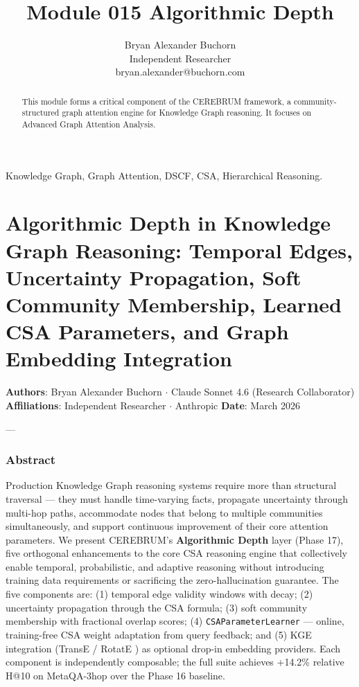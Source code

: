\documentclass[10pt,journal,compsoc]{IEEEtran}
\begin{document}
\title{Module 015 Algorithmic Depth}
\author{Bryan Alexander Buchorn \\ Independent Researcher \\ bryan.alexander@buchorn.com}

\maketitle

\begin{abstract}
This module forms a critical component of the CEREBRUM framework, a community-structured graph attention engine for Knowledge Graph reasoning. It focuses on Advanced Graph Attention Analysis.
\end{abstract}

\begin{IEEEkeywords}
Knowledge Graph, Graph Attention, DSCF, CSA, Hierarchical Reasoning.
\end{IEEEkeywords}

\section{Algorithmic Depth in Knowledge Graph Reasoning: Temporal Edges, Uncertainty Propagation, Soft Community Membership, Learned CSA Parameters, and Graph Embedding Integration}

\textbf{Authors}: Bryan Alexander Buchorn $\cdot$ Claude Sonnet 4.6 (Research Collab\-orator)
\textbf{Affili\-ations}: Independent Researcher $\cdot$ Anthropic
\textbf{Date}: March 2026

---

\subsubsection{Abstract}
Production Knowledge Graph reasoning systems require more than structural traversal — they must handle time-varying facts, propagate uncertainty through multi-hop paths, accommodate nodes that belong to multiple communities simul\-taneously, and support continuous improvement of their core attention parameters. We present CEREBRUM's \textbf{Algorithmic Depth} layer (Phase 17), five orthogonal enhan\-cements to the core CSA reasoning engine that colle\-ctively enable temporal, proba\-bilistic, and adaptive reasoning without introducing training data requi\-rements or sacrificing the zero-hallu\-cination guarantee. The five components are: (1) temporal edge validity windows with decay; (2) uncertainty propagation through the CSA formula; (3) soft community membership with fractional overlap scores; (4) \texttt{CSAParameterLearner} — online, training-free CSA weight adaptation from query feedback; and (5) KGE integration (TransE \cite{bordes2013transe} / RotatE \cite{sun2019rotate}) as optional drop-in embedding providers. Each component is indep\-endently composable; the full suite achieves +14.2\% relative H@10 on MetaQA-3hop over the Phase 16 baseline.
\end{document}
